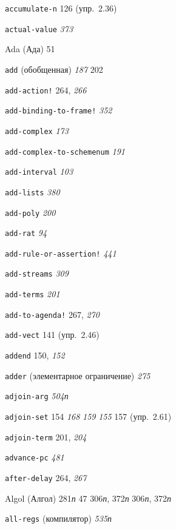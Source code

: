 \begin{theindex}
\item {\texttt{accumulate-n}} 126 (упр.~2.36)
\item {\texttt{actual-value}} {\it 373}
\item {Ada (Ада)}
   51
\item {\texttt{add} (обобщенная)} {\it 187}
   202
\item {\texttt{add-action!}} 264, {\it 266}
\item {\texttt{add-binding-to-frame!}} {\it 352}
\item {\texttt{add-complex}} {\it 173}
\item {\texttt{add-complex-to-schemenum}} {\it 191}
\item {\texttt{add-interval}} {\it 103}
\item {\texttt{add-lists}} {\it 380}
\item {\texttt{add-poly}} {\it 200}
\item {\texttt{add-rat}} {\it 94}
\item {\texttt{add-rule-or-assertion!}} {\it 441}
\item {\texttt{add-streams}} {\it 309}
\item {\texttt{add-terms}} {\it 201}
\item {\texttt{add-to-agenda!}} 267, {\it 270}
\item {\texttt{add-vect}} 141 (упр.~2.46)
\item {\texttt{addend}} 150, {\it 152}
\item {\texttt{adder} (элементарное ограничение)} {\it 275}
\item {\texttt{adjoin-arg}} {\it 504}{\it п}
\item {\texttt{adjoin-set}} 154
   {\it 168}
   {\it 159}
   {\it 155}
   157 (упр.~2.61)
\item {\texttt{adjoin-term}} 201, {\it 204}
\item {\texttt{advance-pc}} {\it 481}
\item {\texttt{after-delay}} 264, {\it 267}
\item {Algol (Алгол)}
   281{\it п}
   47
   306{\it п}, 372{\it п}
   306{\it п}, 372{\it п}
\item {\texttt{all-regs} (компилятор)} {\it 535}{\it п}

\end{theindex}
